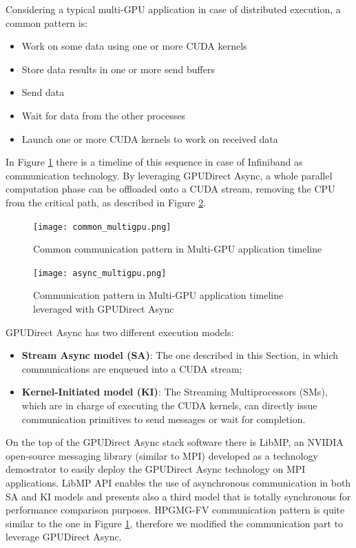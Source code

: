 \documentclass[review]{siamart1116}
\begin{document}
Considering a typical multi-GPU application in case of distributed execution, a common pattern is:
\begin{itemize}
\item Work on some data using one or more CUDA kernels
\item Store data results in one or more send buffers
\item Send data
\item Wait for data from the other processes
\item Launch one or more CUDA kernels to work on received data
\end{itemize}
In Figure \ref{fig:commonmultigpu} there is a timeline of this sequence in case of Infiniband as communication technology. By leveraging GPUDirect Async, a
whole parallel computation phase can be offloaded onto a
CUDA stream, removing the CPU from the critical path, as described
in Figure \ref{fig:asyncmultigpu}.\\

\begin{figure}[h]
\centering
\texttt{[image: common\_multigpu.png]}
\caption{Common communication pattern in Multi-GPU application timeline}
\label{fig:commonmultigpu}
\end{figure}


\begin{figure}[h]
\centering
\texttt{[image: async\_multigpu.png]}
\caption{Communication pattern in Multi-GPU application timeline leveraged with GPUDirect Async}
\label{fig:asyncmultigpu}
\end{figure}

GPUDirect Async has two different execution models:

\begin{itemize}
\item \textbf{Stream Async model (SA)}: The one described in this Section, in which communications are enqueued into a CUDA stream;
\item \textbf{Kernel-Initiated model (KI)}: The Streaming Multiprocessors (SMs), which are in charge of executing the CUDA kernels, can directly issue communication primitives to send messages or wait for completion. %
\end{itemize}

On the top of the GPUDirect Async stack software there is LibMP, an NVIDIA open-source messaging library (similar to MPI) developed as a technology demostrator to easily deploy the GPUDirect Async technology on MPI applications. LibMP API enables the use of asynchronous communication in both SA and KI models and presents also a third model that is totally synchronous for performance comparison purposes.
HPGMG-FV communication pattern is quite similar to the one in Figure
\ref{fig:commonmultigpu}, therefore we modified the communication part
to leverage GPUDirect Async.\\
\end{document}
